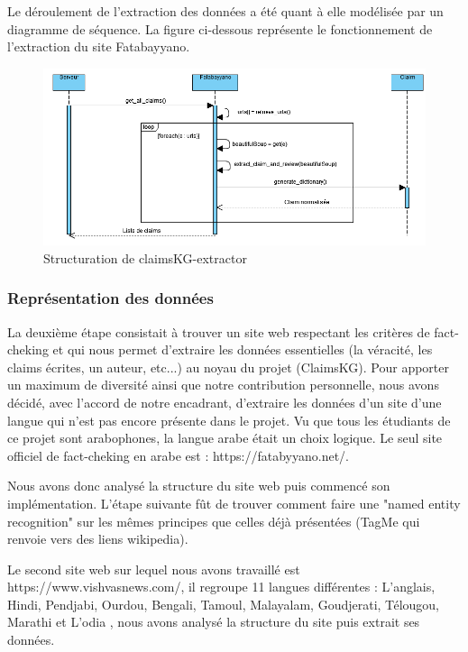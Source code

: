 \documentclass[oneside,13pt,a4paper]{report}
\begin{document}
Le déroulement de l'extraction des données a été quant à elle modélisée par un diagramme de séquence. La figure ci-dessous représente le fonctionnement de l'extraction du site Fatabayyano.

\begin{figure}[h]
	\centering
	\begin{minipage}[c]{.8\linewidth}
		\includegraphics[width=1\textwidth]{img/sequence.png}
		\caption{Structuration de claimsKG-extractor}
	\end{minipage}
\end{figure}
\subsubsection*{Représentation des données}

La deuxième étape consistait à trouver un site web respectant les critères de fact-cheking et qui nous permet d'extraire les données essentielles (la véracité, les claims écrites, un auteur, etc...) au noyau du projet (ClaimsKG). Pour apporter un maximum de diversité ainsi que notre contribution personnelle, nous avons décidé, avec l'accord de notre encadrant, d'extraire les données d'un site d'une langue qui n'est pas encore présente dans le projet. Vu que tous les étudiants de ce projet sont arabophones, la langue arabe était un choix logique. Le seul site officiel de fact-cheking en arabe est : https://fatabyyano.net/.

Nous avons donc analysé la structure du site web puis commencé son implémentation. L'étape suivante fût de trouver comment faire une "named entity recognition" sur les mêmes principes que celles déjà présentées (TagMe qui renvoie vers des liens wikipedia).

Le second site web sur lequel nous avons travaillé est https://www.vishvasnews.com/, il regroupe 11 langues différentes : L'anglais, Hindi, Pendjabi, Ourdou, Bengali, Tamoul, Malayalam, Goudjerati, Télougou, Marathi et L'odia , nous avons analysé la structure du site puis extrait ses données.
\end{document}
